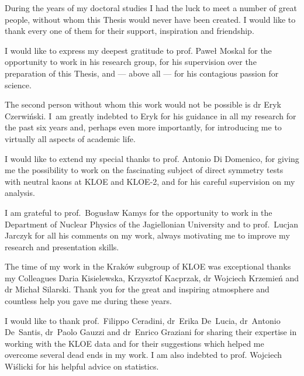 \vspace{10em}

\setlength{\parskip}{1em}

During the years of my doctoral studies I had the luck to meet a number of great people, without whom this Thesis would never have been created. I would like to thank every one of them for their support, inspiration and friendship.

%
%

I would like to express my deepest gratitude to prof. Pawe\l{} Moskal for the opportunity to work in his research group, for his supervision over the preparation of this Thesis, and --- above all --- for his contagious passion for science.

The second person without whom this work would not be possible is dr Eryk Czerwi\'nski. I~am greatly indebted to Eryk for his guidance in all my research for the past six years and, perhaps even more importantly, for introducing me to virtually all aspects of academic life.
%
%

I would like to extend my special thanks to prof. Antonio Di Domenico, for giving me the possibility to work on the fascinating subject of direct symmetry tests with neutral kaons at KLOE and KLOE-2, and for his careful supervision on my analysis.

%
%

I am grateful to prof.\ Bogus\l{}aw Kamys for the opportunity to work in the Department of Nuclear Physics of the Jagiellonian University and to prof.\ Lucjan Jarczyk for all his comments on my work, always motivating me to improve my research and presentation skills.

% 
%

The time of my work in the Krak\'ow subgroup of KLOE was exceptional thanks my Colleagues Daria Kisielewska, Krzysztof Kacprzak, dr Wojciech Krzemie\'n and dr Micha\l{} Silarski. Thank you for the great and inspiring atmosphere and countless help you gave me during these years. 

%
%

I would like to thank prof.\ Filippo Ceradini, dr~Erika De~Lucia, dr~Antonio De~Santis, dr~Paolo Gauzzi and dr~Enrico Graziani for sharing their expertise in working with the KLOE data and for their suggestions which helped me overcome several dead ends in my work. I am also indebted to prof. Wojciech Wiślicki for his helpful advice on statistics.
%
%

